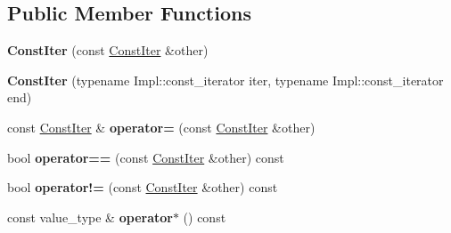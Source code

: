 \subsection*{Public Member Functions}
\begin{DoxyCompactItemize}
\item 
\mbox{\label{classtheoria_1_1util_1_1densemap_1_1ConstIter_a41f22939ee0096d9d395f211fa757726}} 
{\bfseries Const\+Iter} (const \hyperlink{classtheoria_1_1util_1_1densemap_1_1ConstIter}{Const\+Iter} \&other)
\item 
\mbox{\label{classtheoria_1_1util_1_1densemap_1_1ConstIter_a393d12065a54dfadd07acb3268054695}} 
{\bfseries Const\+Iter} (typename Impl\+::const\+\_\+iterator iter, typename Impl\+::const\+\_\+iterator end)
\item 
\mbox{\label{classtheoria_1_1util_1_1densemap_1_1ConstIter_a8c7a0c2774a2d4cb22aa82f83585dd27}} 
const \hyperlink{classtheoria_1_1util_1_1densemap_1_1ConstIter}{Const\+Iter} \& {\bfseries operator=} (const \hyperlink{classtheoria_1_1util_1_1densemap_1_1ConstIter}{Const\+Iter} \&other)
\item 
\mbox{\label{classtheoria_1_1util_1_1densemap_1_1ConstIter_a4fb1efa9f5b9594d3e05a00a04f4e774}} 
bool {\bfseries operator==} (const \hyperlink{classtheoria_1_1util_1_1densemap_1_1ConstIter}{Const\+Iter} \&other) const
\item 
\mbox{\label{classtheoria_1_1util_1_1densemap_1_1ConstIter_a4ce33ebd18a5c6e3aca5efb4e3f83d81}} 
bool {\bfseries operator!=} (const \hyperlink{classtheoria_1_1util_1_1densemap_1_1ConstIter}{Const\+Iter} \&other) const
\item 
\mbox{\label{classtheoria_1_1util_1_1densemap_1_1ConstIter_ae0b3f11bfbeb4ef1335da2eb021d1de8}} 
const value\+\_\+type \& {\bfseries operator$\ast$} () const
\item 
\mbox{\label{classtheoria_1_1util_1_1densemap_1_1ConstIter_a72db96ac5b14a045377b9b840a406d9a}} 

\end{DoxyCompactItemize}
